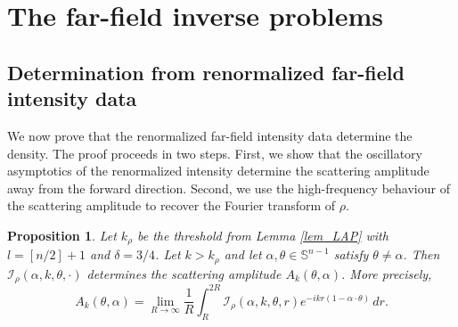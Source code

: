 \documentclass[12pt,a4paper]{amsart}
\numberwithin{equation}{section}
\theoremstyle{plain}
\newtheorem{proposition}[theorem]{Proposition}
\theoremstyle{definition}
\begin{document}
\section{The far-field inverse problems}\label{sec:farfield}

\subsection{Determination from renormalized far-field intensity data}
We now prove that the renormalized far-field intensity data determine the
density. The proof proceeds in two steps. First, we show that the oscillatory
asymptotics of the renormalized intensity determine the scattering amplitude
away from the forward direction. Second, we use the high-frequency behaviour of
the scattering amplitude to recover the Fourier transform of $\rho$.



\begin{proposition}\label{prop:justification_Ak}
Let $k_\rho$ be the threshold from Lemma \ref{lem_LAP} with $l=[n/2]+1$ and $\delta=3/4$. Let $k>k_\rho$ and let $\alpha,\theta\in\mathbb S^{n-1}$ satisfy
$\theta\neq\alpha$. Then $\mathcal I_\rho(\alpha,k,\theta,\cdot)$ determines the scattering amplitude $A_k(\theta,\alpha)$.
More precisely,
\begin{equation}\label{eq:Ak_recovery_from_Irho}
    A_k(\theta,\alpha)
    =
    \lim_{R\to\infty}
    \frac{1}{R}
    \int_R^{2R}
    \mathcal I_\rho(\alpha,k,\theta,r)
    e^{-ikr(1-\alpha\cdot\theta)}\,dr .
\end{equation}
\end{proposition}
\end{document}
